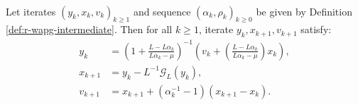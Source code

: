 \documentclass[12pt]{article}
\begin{document}
        \begin{proposition}\label{prop:wagp-st-form}\;\\
            Let iterates $(y_k, x_{k}, v_{k})_{k \ge 1}$ and sequence $(\alpha_k, \rho_k)_{k \ge 0}$ be given by Definition \ref{def:r-wapg-intermediate}.
            Then for all $k \ge 1$, iterate $y_k, x_{k + 1}, v_{k + 1}$
            satisfy:
            \begin{align}
                y_{k} &=
                \left(
                    1 + \frac{L - L\alpha_{k}}{L\alpha_{k} - \mu}
                \right)^{-1}
                \left(
                    v_{k} +
                    \left(\frac{L - L\alpha_{k}}{L\alpha_{k} - \mu} \right) x_{k}
                \right),
                \label{eqn:rwapg-st-form-eqn-1}
                \\
                x_{k + 1} &=
                y_k - L^{-1} \mathcal G_L (y_k),
                \\
                v_{k + 1} &= x_{k + 1} + (\alpha_k^{-1} - 1)(x_{k + 1} - x_k).
                \label{eqn:rwapg-st-form-eqn-3}
            \end{align}
        \end{proposition}
\end{document}
